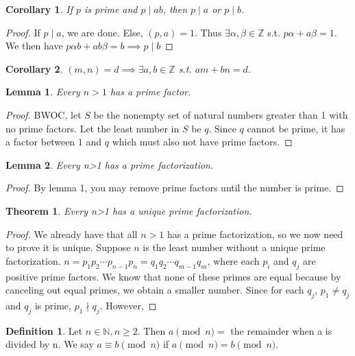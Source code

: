 \documentclass{article}
\theoremstyle{definition}
\newtheorem{definition}{Definition}
\theoremstyle{plain}
\newtheorem{theorem}{Theorem}
\theoremstyle{corollary}
\newtheorem{corollary}{Corollary}
\theoremstyle{lemma}
\newtheorem{lemma}{Lemma}
\begin{document}
\begin{corollary}
If $p$ is prime and $p\mid ab$, then $p\mid a$ or $p\mid b$.
\end{corollary}

\begin{proof}
If $p\mid a$, we are done. Else, $(p,a)=1$. Thus $\exists \alpha,\beta\in\mathbb{Z}$ s.t. $p\alpha+a\beta=1$.
We then have $p\alpha b+ ab\beta=b\implies p\mid b$
\end{proof}

\begin{corollary}
$(m,n)=d\implies\exists a,b\in\mathbb{Z}$ s.t. $am+bn=d$.
\end{corollary}

\begin{lemma}
Every $n>1$ has a prime factor.
\end{lemma}

\begin{proof}
BWOC, let $S$ be the nonempty set of natural numbers greater than 1 with no prime factors. Let the least number in $S$ be $q$. Since $q$ cannot be prime, it has a factor between $1$ and $q$ which must also not have prime factors.
\end{proof}

\begin{lemma}
Every n>1 has a prime factorization.
\end{lemma}

\begin{proof}
By lemma 1, you may remove prime factors until the number is prime.
\end{proof}

\begin{theorem}
Every n>1 has a unique prime factorization.
\end{theorem}

\begin{proof}
We already have that all $n>1$ has a prime factorization, so we now need to prove it is unique. 
Suppose $n$ is the least number without a unique prime factorization.
$n=p_1p_2\cdots p_{n-1}p_n=q_1q_2\cdots q_{m-1}q_m$, where each $p_i$ and $q_j$ are positive prime factors. We know that none of these primes are equal because by canceling out equal primes, we obtain a smaller number.
Since for each $q_j$, $p_1\neq q_j$ and $q_j$ is prime, $p_1\nmid q_j$. However, 
\end{proof}

\begin{definition}
Let $n \in \mathbb{N}, n \geq 2.$ Then $a \pmod{n} =$ the remainder when a is divided by n. We say $a \equiv b \pmod{n}$ if $a \pmod{n} = b \pmod{n}.$
\end{definition}
\end{document}
